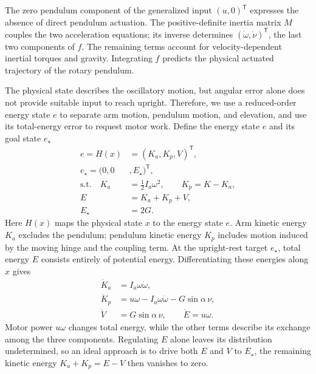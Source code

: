 \documentclass[letterpaper,10pt,conference]{ieeeconf}
\newcommand{\Estar}{E_{\star}}
\begin{document}
The zero pendulum component of the generalized input $(u,0)^{\mathsf T}$ expresses the absence of direct pendulum actuation. The positive-definite inertia matrix $M$ couples the two acceleration equations; its inverse determines $(\dot\omega,\dot\nu)^{\mathsf T}$, the last two components of $f$. The remaining terms account for velocity-dependent inertial torques and gravity. Integrating $f$ predicts the physical actuated trajectory of the rotary pendulum.

The physical state describes the oscillatory motion, but angular error alone does not provide suitable input to reach upright. Therefore, we use a reduced-order energy state $e$ to separate arm motion, pendulum motion, and elevation, and use its total-energy error to request motor work. Define the energy state $e$ and its goal state $e_\star$
\begin{equation}
\begin{aligned}
 e=H(x)&=(K_a,K_p,V)^{\mathsf T},\\
 e_\star=(0,0&,\Estar)^{\mathsf T},\\
 \text{s.t.} \quad K_a&=\tfrac12I_a\omega^2,\qquad K_p=K-K_a,\\
 E&=K_a+K_p+V,\\
 \Estar&=2G.
\end{aligned}
\label{eq:encoder}
\end{equation}
Here $H(x)$ maps the physical state $x$ to the energy state $e$. Arm kinetic energy $K_a$ excludes the pendulum; pendulum kinetic energy $K_p$ includes motion induced by the moving hinge and the coupling term. At the upright-rest target $e_\star$, total energy $E$ consists entirely of potential energy. Differentiating these energies along $x$ gives
\begin{equation}
\begin{aligned}
 \dot K_a&=I_a\omega\dot\omega,\\
 \dot K_p&=u\omega-I_a\omega\dot\omega-G\sin\alpha\,\nu,\\
 \dot V&=G\sin\alpha\,\nu,\qquad \dot E=u\omega.
\end{aligned}
\label{eq:powers}
\end{equation}
Motor power $u\omega$ changes total energy, while the other terms describe its exchange among the three components. Regulating $E$ alone leaves its distribution undetermined, so an ideal approach is to drive both $E$ and $V$ to $\Estar$, the remaining kinetic energy $K_a+K_p=E-V$ then vanishes to zero.
\end{document}

